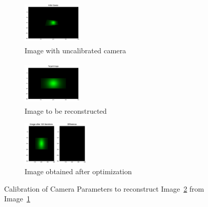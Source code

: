\documentclass{juliacon}
\begin{document}
\begin{figure}[!htb]
    \centering
    \begin{subfigure}[c]{0.26\textwidth}
        \centering
        \includegraphics[width=107px, height=80px]{images/camera/initial_guess_image.png}
        \caption{Image with uncalibrated camera}
        \label{fig:cam_guess}
    \end{subfigure}
    \hfill
    \begin{subfigure}[c]{0.26\textwidth}
        \centering          
        \includegraphics[width=107px, height=80px]{images/camera/target_image.png}
        \caption{Image to be reconstructed}
        \label{fig:cam_target}
    \end{subfigure}
    \centering
    \begin{subfigure}[c]{0.47\textwidth}
        \centering
        \includegraphics[width=\textwidth, height=80px]{images/camera/iter_120.png}
        \caption{Image obtained after optimization}
    \end{subfigure}
    \caption{Calibration of Camera Parameters to reconstruct Image~\ref{fig:cam_target} from Image~\ref{fig:cam_guess}}
    \label{fig:cam_invrender}
\end{figure}
\end{document}
